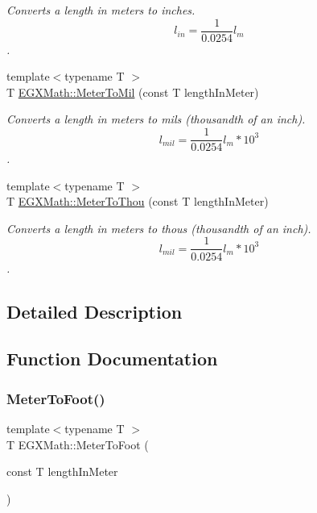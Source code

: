 \begin{DoxyCompactItemize}
\begin{DoxyCompactList}\small\item\em Converts a length in meters to inches. \[ l_{in}=\frac{1}{0.0254} l_{m} \]. \end{DoxyCompactList}\item 
{\footnotesize template$<$typename T $>$ }\\T \mbox{\hyperlink{group___e_g_x_math-_conversions-_length_conversions-_meter-_imperial_ga6a58893d0f7e17e425c7bd0b3235320d}{E\+G\+X\+Math\+::\+Meter\+To\+Mil}} (const T length\+In\+Meter)
\begin{DoxyCompactList}\small\item\em Converts a length in meters to mils (thousandth of an inch). \[ l_{mil}= \frac{1}{0.0254} l_{m} * 10^{3} \]. \end{DoxyCompactList}\item 
{\footnotesize template$<$typename T $>$ }\\T \mbox{\hyperlink{group___e_g_x_math-_conversions-_length_conversions-_meter-_imperial_gaebe39a6b8485aae53724390225f27a66}{E\+G\+X\+Math\+::\+Meter\+To\+Thou}} (const T length\+In\+Meter)
\begin{DoxyCompactList}\small\item\em Converts a length in meters to thous (thousandth of an inch). \[ l_{mil}= \frac{1}{0.0254} l_{m} * 10^{3} \]. \end{DoxyCompactList}\end{DoxyCompactItemize}


\subsection{Detailed Description}


\subsection{Function Documentation}
\mbox{\label{group___e_g_x_math-_conversions-_length_conversions-_meter-_imperial_gad5d3d7875ebe02e1a988665271360f34}} 
\subsubsection{\texorpdfstring{Meter\+To\+Foot()}{MeterToFoot()}}
{\footnotesize\ttfamily template$<$typename T $>$ \\
T E\+G\+X\+Math\+::\+Meter\+To\+Foot (\begin{DoxyParamCaption}\item[{const T}]{length\+In\+Meter }\end{DoxyParamCaption})}



